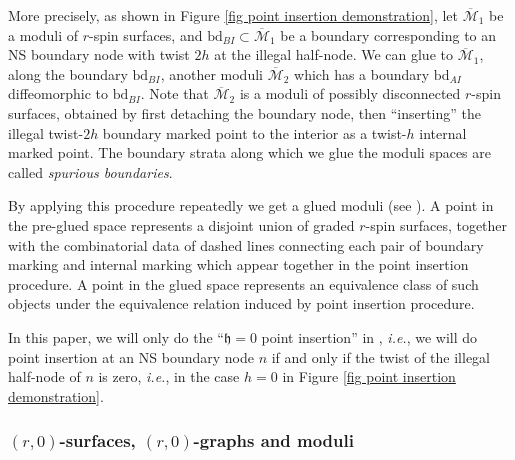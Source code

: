 \documentclass[11pt]{amsart}
\theoremstyle{definition}
\theoremstyle{remark}
\newcommand{\<}{\left<}
\renewcommand{\>}{\right>}
\numberwithin{equation}{section}
\def\Mbar{{\overline{\mathcal M}}}
\def\h{{\mathfrak h}}
\begin{document}
More precisely, as shown in Figure \ref{fig point insertion demonstration}, let $\Mbar_1$ be a moduli of $r$-spin surfaces, and $\text{bd}_{BI}\subset \Mbar_1$ be a boundary corresponding to an NS boundary node with twist $2h$ at the illegal half-node. We can glue to $\Mbar_1$, along the boundary $\text{bd}_{BI}$, another moduli $\Mbar_2$ which has a boundary $\text{bd}_{AI}$ diffeomorphic to $\text{bd}_{BI}$. Note that $\Mbar_2$ is a moduli of possibly disconnected $r$-spin surfaces, obtained by first detaching the boundary node, then ``inserting'' the illegal twist-$2h$ boundary marked point to the interior as a twist-$h$ internal marked point. The boundary strata along which we glue the moduli spaces are called \emph{spurious boundaries}.

By applying this procedure repeatedly we get a glued moduli (see \cite[\S 4.6]{TZ1}). A point in the pre-glued space represents a disjoint union of graded $r$-spin surfaces, together with the combinatorial data of dashed lines connecting each pair of boundary marking and internal marking which appear together in the point insertion procedure. A point in the glued space represents an equivalence class of such objects under the equivalence relation induced by point insertion procedure.

In this paper, we will only do the ``$\h=0$ point insertion'' in \cite{TZ1}, \textit{i.e.}, we will  do point insertion at an NS boundary node $n$ if and only if the twist of the illegal half-node of $n$ is zero, \textit{i.e.}, in the case $h=0$ in Figure \ref{fig point insertion demonstration}.



\subsubsection{$(r,0)$-surfaces, $(r,0)$-graphs and moduli}
\end{document}
